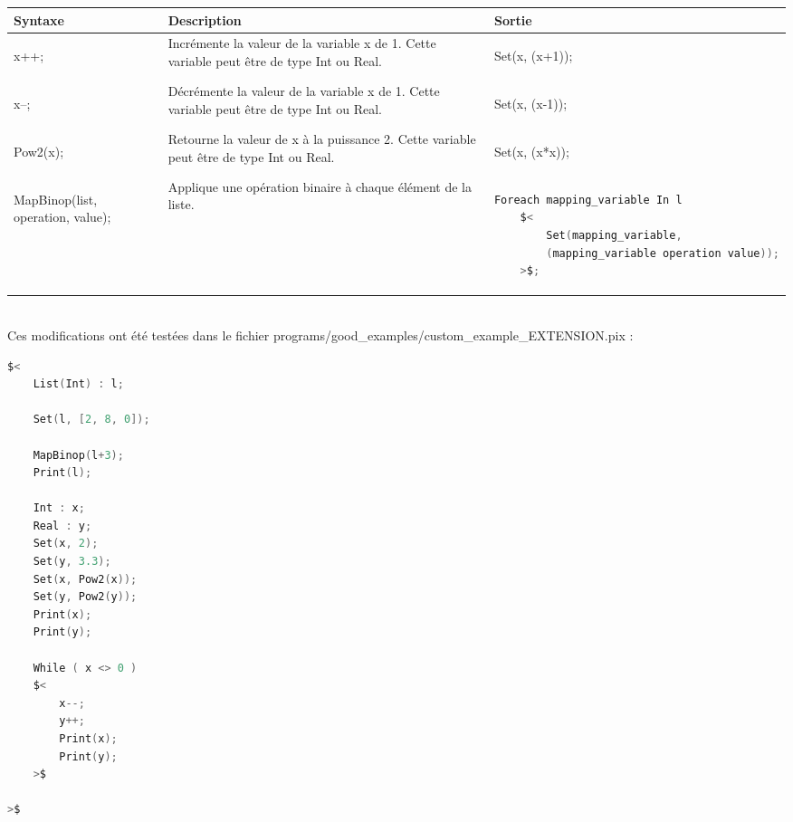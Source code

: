 \documentclass{report}
\begin{document}
    \begin{tabular}{| m{3cm} | m{7cm} | m{5cm} |}
        \hline
        Syntaxe & Description & Sortie \\
        \hline
        \begin{center}
x++;
        \end{center}
        & Incrémente la valeur de la variable x de 1. Cette variable peut être de type Int ou Real. & 
        \begin{center}
Set(x, (x+1));
        \end{center}\\
        \hline
        \begin{center}
x--;
        \end{center}
        & Décrémente la valeur de la variable x de 1. Cette variable peut être de type Int ou Real. & 
        \begin{center}
Set(x, (x-1));
        \end{center}\\
        \hline
        \begin{center}
Pow2(x);
        \end{center}
        & Retourne la valeur de x à la puissance 2. Cette variable peut être de type Int ou Real. & 
        \begin{center}
Set(x, (x*x));
        \end{center}\\
        \hline
        {\tiny
        \begin{center}
MapBinop(list, 
         operation, 
         value);
        \end{center}
        }
        & Applique une opération binaire à chaque élément de la liste. & 
        {\tiny
        \begin{lstlisting}[language=C, basicstyle=\ttfamily]
Foreach mapping_variable In l
    $<
        Set(mapping_variable, 
        (mapping_variable operation value));
    >$;
        \end{lstlisting}
        }\\
        \hline
    \end{tabular}\\

Ces modifications ont été testées dans le fichier programs/good\_examples/custom\_example\_EXTENSION.pix :\\

    \begin{lstlisting}[language=C, basicstyle=\ttfamily]
$<
    List(Int) : l;

    Set(l, [2, 8, 0]);
    
    MapBinop(l+3);
    Print(l);

    Int : x;
    Real : y;
    Set(x, 2);
    Set(y, 3.3);
    Set(x, Pow2(x));
    Set(y, Pow2(y));
    Print(x);
    Print(y);

    While ( x <> 0 )
    $<
        x--;
        y++;
        Print(x);
        Print(y);
    >$
    
>$
    \end{lstlisting}
\end{document}
